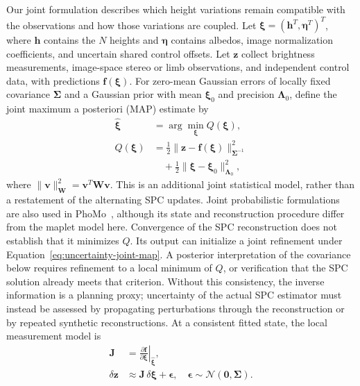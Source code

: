 Our joint formulation describes which height variations remain compatible with the observations and how those variations are coupled. Let $\boldsymbol\xi=(\mathbf h^T,\boldsymbol\eta^T)^T$, where $\mathbf h$ contains the $N$ heights and $\boldsymbol\eta$ contains albedos, image normalization coefficients, and uncertain shared control offsets. Let $\mathbf z$ collect brightness measurements, image-space stereo or limb observations, and independent control data, with predictions $\mathbf f(\boldsymbol\xi)$. For zero-mean Gaussian errors of locally fixed covariance $\boldsymbol\Sigma$ and a Gaussian prior with mean $\boldsymbol\xi_0$ and precision $\boldsymbol\Lambda_0$, define the joint maximum a posteriori (MAP) estimate by
\begin{equation}
    \begin{aligned}
        \hat{\boldsymbol\xi}&=\arg\min_{\boldsymbol\xi} Q(\boldsymbol\xi),\\
        Q(\boldsymbol\xi)&=\tfrac12\|\mathbf z-\mathbf f(\boldsymbol\xi)\|^2_{\boldsymbol\Sigma^{-1}}\\
        &\quad+\tfrac12\|\boldsymbol\xi-\boldsymbol\xi_0\|^2_{\boldsymbol\Lambda_0},
    \end{aligned}
    \label{eq:uncertainty-joint-map}
\end{equation}
where $\|\mathbf v\|^2_{\mathbf W}=\mathbf v^T\mathbf W\mathbf v$. This is an additional joint statistical model, rather than a restatement of the alternating SPC updates. Joint probabilistic formulations are also used in PhoMo~\citep{driver2025}, although its state and reconstruction procedure differ from the maplet model here.
Convergence of the SPC reconstruction does not establish that it minimizes $Q$. Its output can initialize a joint refinement under Equation~\ref{eq:uncertainty-joint-map}. A posterior interpretation of the covariance below requires refinement to a local minimum of $Q$, or verification that the SPC solution already meets that criterion. Without this consistency, the inverse information is a planning proxy; uncertainty of the actual SPC estimator must instead be assessed by propagating perturbations through the reconstruction or by repeated synthetic reconstructions.
At a consistent fitted state, the local measurement model is
\begin{equation}
    \begin{aligned}
        \mathbf J&=
        \left.\frac{\partial\mathbf f}{\partial\boldsymbol\xi}
        \right|_{\hat{\boldsymbol\xi}},\\
        \delta\mathbf z&\approx\mathbf J\,\delta\boldsymbol\xi+\boldsymbol\epsilon,
        \quad \boldsymbol\epsilon\sim\mathcal N(\mathbf0,\boldsymbol\Sigma).
    \end{aligned}
    \label{eq:uncertainty-jacobian}
\end{equation}
